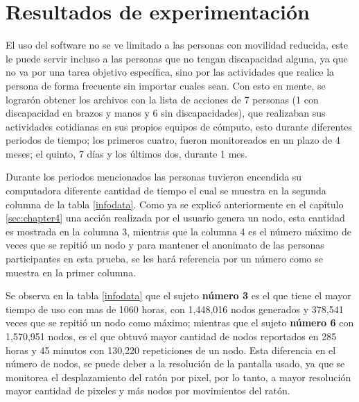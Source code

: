 \section{Resultados de experimentaci\'on}

El uso del software no se ve limitado a las personas con movilidad reducida,
 este le puede servir incluso a las personas que no tengan discapacidad 
 alguna, ya que no va por una tarea objetivo espec\'ifica, sino por las 
 actividades que realice la persona de forma frecuente sin importar cuales 
 sean. Con esto en mente, se lograr\'on obtener los archivos con la lista de
 acciones de 7 personas (1 con discapacidad en brazos y manos y 6 sin 
 discapacidades), que realizaban sus actividades cotidianas en sus propios 
 equipos de c\'omputo, esto durante diferentes periodos de tiempo; los primeros 
 cuatro, fueron monitoreados en un plazo de 4 meses; el quinto, 7 d\'ias y los 
 \'ultimos dos, durante 1 mes. 
 
Durante los periodos mencionados las personas tuvieron encendida su 
 computadora diferente cantidad 
 de tiempo el cual se muestra en la segunda columna de la tabla 
 \ref{infodata}. Como ya se explic\'o anteriormente en el cap\'itulo 
 \ref{sec:chapter4} una acci\'on realizada por el usuario genera un nodo, 
 esta cantidad es mostrada en la columna 3, mientras que la columna 4 es el 
 n\'umero m\'aximo de veces que se repiti\'o un nodo y para mantener el 
 anonimato de las personas participantes en esta prueba, se les har\'a 
 referencia por un n\'umero como se muestra en la primer columna. 

Se observa en la tabla \ref{infodata} que el sujeto \textbf{n\'umero 3}
 es el que tiene el mayor tiempo de uso con mas de 1060 horas, con
 1,448,016 nodos generados y 378,541 veces que se repiti\'o un nodo como 
 m\'aximo; mientras que el sujeto \textbf{n\'umero 6} con 1,570,951 nodos, es 
 el que obtuv\'o mayor cantidad de nodos reportados en 285 horas y 45 minutos 
 con 130,220 repeticiones de un nodo. Esta diferencia en el n\'umero de nodos, 
 se puede deber a la resoluci\'on de la pantalla usado, ya que se monitorea el 
 desplazamiento del rat\'on por pixel, por lo tanto, a mayor resoluci\'on mayor 
 cantidad de pixeles y m\'as nodos por movimientos del rat\'on.
 

